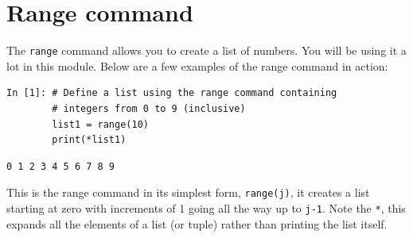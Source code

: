 
        
        


\newpage

\section{Range command}
\label{sec:range}
The \texttt{range} command allows you to create a list of numbers. You will be using it a lot in this module. Below are a few examples of the range command in action:
\begin{lstlisting}[style=PY]
In [1]: # Define a list using the range command containing 
        # integers from 0 to 9 (inclusive)
        list1 = range(10)
        print(*list1)
\end{lstlisting}
\begin{lstlisting}[style=PY_out]
        0 1 2 3 4 5 6 7 8 9
\end{lstlisting}

\noindent This is the range command in its simplest form, \texttt{range(j)}, it creates a list starting at zero with increments of 1 going all the way up to \texttt{j-1}. Note the \texttt{*}, this expands all the elements of a list (or tuple) rather than printing the list itself.


